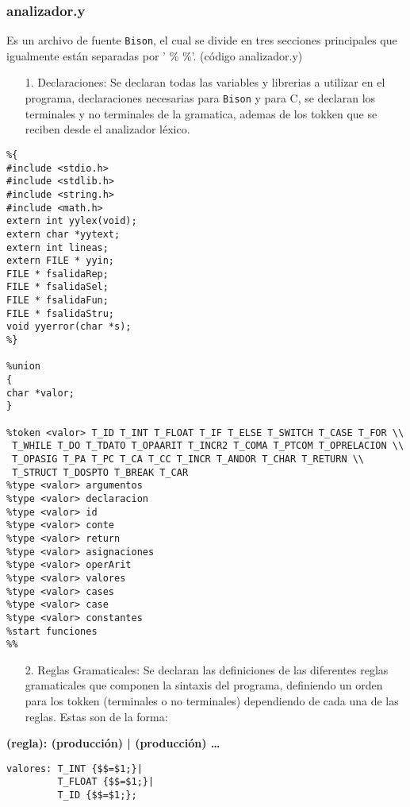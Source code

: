 \documentclass[spanish]{article}
\begin{document}
\subsubsection{analizador.y}
Es un archivo de fuente \texttt{Bison},  el cual se divide en tres secciones principales que igualmente están separadas por ’ \% \%’.  (código analizador.y)

\begin{enumerate}
\item[1.] Declaraciones: Se declaran todas las variables y librerias a utilizar en el programa, declaraciones necesarias para \texttt{Bison} y para C, se declaran los terminales y no terminales de la gramatica, ademas de los tokken que se reciben desde el analizador léxico.
\end{enumerate} 
\begin{lstlisting}
%{
#include <stdio.h>
#include <stdlib.h>
#include <string.h>
#include <math.h>
extern int yylex(void);
extern char *yytext;
extern int lineas;
extern FILE * yyin;
FILE * fsalidaRep;
FILE * fsalidaSel;
FILE * fsalidaFun;
FILE * fsalidaStru;
void yyerror(char *s);
%}

%union
{
char *valor;
}

%token <valor> T_ID T_INT T_FLOAT T_IF T_ELSE T_SWITCH T_CASE T_FOR \\
 T_WHILE T_DO T_TDATO T_OPAARIT T_INCR2 T_COMA T_PTCOM T_OPRELACION \\
 T_OPASIG T_PA T_PC T_CA T_CC T_INCR T_ANDOR T_CHAR T_RETURN \\
 T_STRUCT T_DOSPTO T_BREAK T_CAR
%type <valor> argumentos
%type <valor> declaracion
%type <valor> id
%type <valor> conte
%type <valor> return
%type <valor> asignaciones
%type <valor> operArit
%type <valor> valores
%type <valor> cases
%type <valor> case
%type <valor> constantes
%start funciones
%%
\end{lstlisting}
\begin{enumerate}
\item[2.]Reglas Gramaticales: Se declaran las definiciones de las diferentes reglas gramaticales que componen la sintaxis del programa, definiendo un orden para los tokken (terminales o no terminales)  dependiendo de cada una de las reglas. Estas son de la forma: 
\end{enumerate}
\begin{center}
{\ttfamily \textbf{(regla): (producción) | (producción) … }}
\end{center}
\begin{lstlisting}
valores: T_INT {$$=$1;}|
         T_FLOAT {$$=$1;}|
         T_ID {$$=$1;};

\end{lstlisting}
\end{document}
